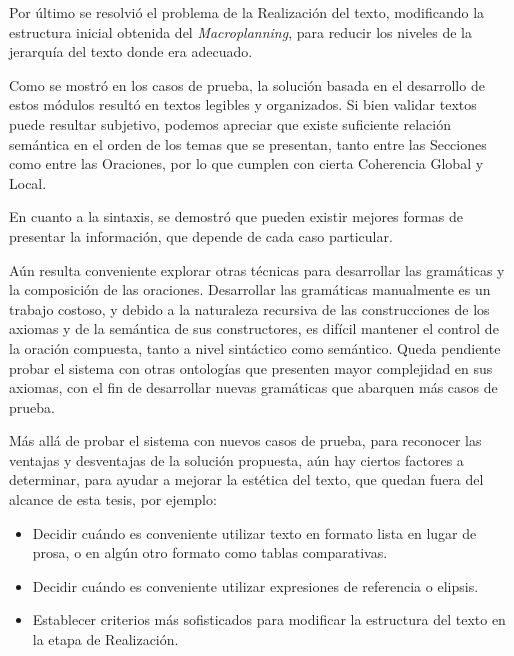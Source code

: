 Por último se resolvió el problema de la Realización del texto, modificando la estructura inicial obtenida del \emph{Macroplanning}, para reducir los niveles de la jerarquía del texto donde era adecuado. 

Como se mostró en los casos de prueba, la solución basada en el desarrollo de estos módulos resultó en textos legibles y organizados. Si bien validar textos puede resultar subjetivo, podemos apreciar que existe suficiente relación semántica en el orden de los temas que se presentan, tanto entre las Secciones como entre las Oraciones, por lo que cumplen con cierta Coherencia Global y Local.

En cuanto a la sintaxis, se demostró que pueden existir mejores formas de presentar la información, que depende de cada caso particular.

Aún resulta conveniente explorar otras técnicas para desarrollar las gramáticas y la composición de las oraciones. Desarrollar las gramáticas manualmente es un trabajo costoso, y debido a la naturaleza recursiva de las construcciones de los axiomas y de la semántica de sus constructores, es difícil mantener el control de la oración compuesta, tanto a nivel sintáctico como semántico. Queda pendiente probar el sistema con otras ontologías que presenten mayor complejidad en sus axiomas, con el fin de desarrollar nuevas gramáticas que abarquen más casos de prueba.

Más allá de probar el sistema con nuevos casos de prueba, para reconocer las ventajas y desventajas de la solución propuesta, aún hay ciertos factores a determinar, para ayudar a mejorar la estética del texto, que quedan fuera del alcance de esta tesis, por ejemplo:
\begin{itemize}
    \item Decidir cuándo es conveniente utilizar texto en formato lista en lugar de prosa, o en algún otro formato como tablas comparativas.
    \item Decidir cuándo es conveniente utilizar expresiones de referencia o elipsis.
    \item Establecer criterios más sofisticados para modificar la estructura del texto en la etapa de Realización. 
\end{itemize}

